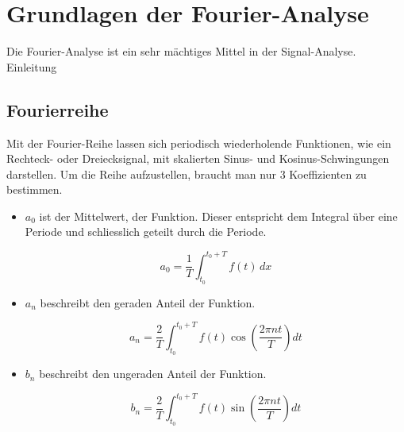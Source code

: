 %
%
%
%

\section{Grundlagen der Fourier-Analyse\label{fourier:section:GrundlagenFourierAnalyse}}

Die Fourier-Analyse ist ein sehr mächtiges Mittel in der Signal-Analyse. 
Einleitung %




\subsection{Fourierreihe\label{fourier:subsection:fourierreihe}}

Mit der Fourier-Reihe lassen sich periodisch wiederholende Funktionen, wie ein Rechteck- oder Dreiecksignal, mit skalierten Sinus- und Kosinus-Schwingungen darstellen.
Um die Reihe aufzustellen, braucht man nur 3 Koeffizienten zu bestimmen. 

\begin{itemize}
	\item $a_0$ ist der Mittelwert, der Funktion. 
	Dieser entspricht dem Integral über eine Periode und schliesslich geteilt durch die Periode. 
	
	\begin{equation}
		a_0 = \frac{1}{T} \int_{t_0}^{t_0 + T} f(t) \, dx
	\end{equation}
	
	\item $a_n$ beschreibt den geraden Anteil der Funktion.
	
	\begin{equation}
		a_n = \frac{2}{T} \int_{t_0}^{t_0 + T} f(t) \cos\left(\frac{2\pi n t}{T}\right) dt
	\end{equation}
	
	\item $b_n$ beschreibt den ungeraden Anteil der Funktion.
	
	\begin{equation}
		b_n = \frac{2}{T} \int_{t_0}^{t_0 + T} f(t) \sin\left(\frac{2\pi n t}{T}\right) dt
	\end{equation}
	
\end{itemize}

